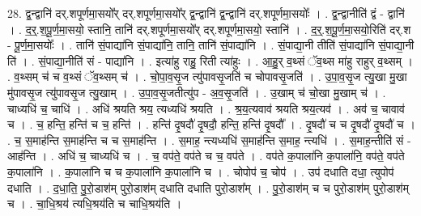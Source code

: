 \documentclass[17pt]{extarticle}
\begin{document}
28. द्व॒न्द्वानि॑ दर्.शपूर्णमा॒सयो᳚र् दर्.शपूर्णमा॒सयो᳚र् द्व॒न्द्वानि॑ द्व॒न्द्वानि॑ दर्.शपूर्णमा॒सयोः᳚ । . द्व॒न्द्वानीति॑ द्वं - द्वानि॑ । . द॒र्॒.श॒पू॒र्ण॒मा॒सयो॒ स्तानि॒ तानि॑ दर्.शपूर्णमा॒सयो᳚र् दर्.शपूर्णमा॒सयो॒ स्तानि॑ । . द॒र्॒.श॒पू॒र्ण॒मा॒सयो॒रिति॑ दर्.श - पू॒र्ण॒मा॒सयोः᳚ । . तानि॑ सं॒पाद्या॑नि सं॒पाद्या॑नि॒ तानि॒ तानि॑ सं॒पाद्या॑नि । . सं॒पाद्या॒नी तीति॑ सं॒पाद्या॑नि सं॒पाद्या॒नी ति॑ । . सं॒पाद्या॒नीति॑ सं - पाद्या॑नि । . इत्या॑हु राहु॒ रिती त्या॑हुः । . आ॒हु॒र् व॒थ्सं ॅव॒थ्स मा॑हु राहुर् व॒थ्सम् । . व॒थ्सम् च॑ च व॒थ्सं ॅव॒थ्सम् च॑ । . चो॒पा॒व॒सृ॒ज त्यु॑पावसृ॒जति॑ च चोपावसृ॒जति॑ । . उ॒पा॒व॒सृ॒ज त्यु॒खा मु॒खा मु॑पावसृ॒ज त्यु॑पावसृ॒ज त्यु॒खाम् । . उ॒पा॒व॒सृ॒जतीत्यु॑प - अ॒व॒सृ॒जति॑ । . उ॒खाम् च॑ चो॒खा मु॒खाम् च॑ । . चाध्यधि॑ च॒ चाधि॑ । . अधि॑ श्रयति श्रय॒ त्यध्यधि॑ श्रयति । . श्र॒य॒त्यवाव॑ श्रयति श्रय॒त्यव॑ । . अव॑ च॒ चावाव॑ च । . च॒ हन्ति॒ हन्ति॑ च च॒ हन्ति॑ । . हन्ति॑ दृ॒षदौ॑ दृ॒षदौ॒ हन्ति॒ हन्ति॑ दृ॒षदौ᳚ । . दृ॒षदौ॑ च च दृ॒षदौ॑ दृ॒षदौ॑ च । . च॒ स॒माह॑न्ति स॒माह॑न्ति च च स॒माह॑न्ति । . स॒माह॒ न्त्यध्यधि॑ स॒माह॑न्ति स॒माह॒ न्त्यधि॑ । . स॒माह॒न्तीति॑ सं - आह॑न्ति । . अधि॑ च॒ चाध्यधि॑ च । . च॒ वप॑ते॒ वप॑ते च च॒ वप॑ते । . वप॑ते क॒पाला॑नि क॒पाला॑नि॒ वप॑ते॒ वप॑ते क॒पाला॑नि । . क॒पाला॑नि च च क॒पाला॑नि क॒पाला॑नि च । . चोपोप॑ च॒ चोप॑ । . उप॑ दधाति दधा॒ त्युपोप॑ दधाति । . द॒धा॒ति॒ पु॒रो॒डाश॑म् पुरो॒डाश॑म् दधाति दधाति पुरो॒डाश᳚म् । . पु॒रो॒डाश॑म् च च पुरो॒डाश॑म् पुरो॒डाश॑म् च । . चा॒धि॒श्रय॑ त्यधि॒श्रय॑ति च चाधि॒श्रय॑ति । \newline
\end{document}
